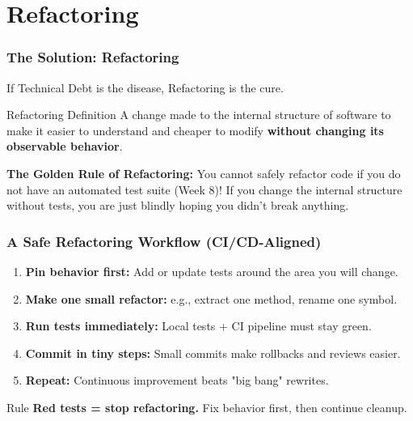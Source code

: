 \documentclass[xcolor=table]{beamer}
\begin{document}
\section{Refactoring}

\begin{frame}
    \frametitle{The Solution: Refactoring}
    If Technical Debt is the disease, Refactoring is the cure.
    
    \vspace{0.3cm}
    \begin{block}{Refactoring Definition}
        A change made to the internal structure of software to make it easier to understand and cheaper to modify \textbf{without changing its observable behavior}.
    \end{block}
    
    \vspace{0.3cm}
    \textbf{The Golden Rule of Refactoring:}
    You cannot safely refactor code if you do not have an automated test suite (Week 8)! If you change the internal structure without tests, you are just blindly hoping you didn't break anything.
\end{frame}

\begin{frame}
    \frametitle{A Safe Refactoring Workflow (CI/CD-Aligned)}
    \begin{enumerate}
        \item \textbf{Pin behavior first:} Add or update tests around the area you will change.
        \item \textbf{Make one small refactor:} e.g., extract one method, rename one symbol.
        \item \textbf{Run tests immediately:} Local tests + CI pipeline must stay green.
        \item \textbf{Commit in tiny steps:} Small commits make rollbacks and reviews easier.
        \item \textbf{Repeat:} Continuous improvement beats "big bang" rewrites.
    \end{enumerate}

    \vspace{0.3cm}
    \begin{alertblock}{Rule}
        \textbf{Red tests = stop refactoring.} Fix behavior first, then continue cleanup.
    \end{alertblock}
\end{frame}
\end{document}
